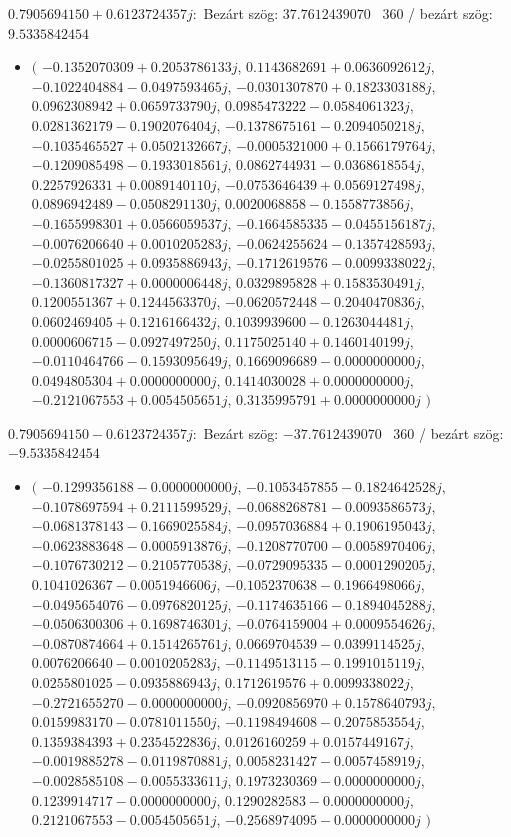 \documentclass[14pt,a4paper]{article}
\begin{document}
$0.7905694150+0.6123724357j$:\
Bezárt szög: $37.7612439070$ \
360 / bezárt szög: $9.5335842454$\
\begin{itemize}
\item
$\big($
$-0.1352070309+0.2053786133j$, $0.1143682691+0.0636092612j$, $-0.1022404884-0.0497593465j$, $-0.0301307870+0.1823303188j$, $0.0962308942+0.0659733790j$, $0.0985473222-0.0584061323j$, $0.0281362179-0.1902076404j$, $-0.1378675161-0.2094050218j$, $-0.1035465527+0.0502132667j$, $-0.0005321000+0.1566179764j$, $-0.1209085498-0.1933018561j$, $0.0862744931-0.0368618554j$, $0.2257926331+0.0089140110j$, $-0.0753646439+0.0569127498j$, $0.0896942489-0.0508291130j$, $0.0020068858-0.1558773856j$, $-0.1655998301+0.0566059537j$, $-0.1664585335-0.0455156187j$, $-0.0076206640+0.0010205283j$, $-0.0624255624-0.1357428593j$, $-0.0255801025+0.0935886943j$, $-0.1712619576-0.0099338022j$, $-0.1360817327+0.0000006448j$, $0.0329895828+0.1583530491j$, $0.1200551367+0.1244563370j$, $-0.0620572448-0.2040470836j$, $0.0602469405+0.1216166432j$, $0.1039939600-0.1263044481j$, $0.0000606715-0.0927497250j$, $0.1175025140+0.1460140199j$, $-0.0110464766-0.1593095649j$, $0.1669096689-0.0000000000j$, $0.0494805304+0.0000000000j$, $0.1414030028+0.0000000000j$, $-0.2121067553+0.0054505651j$, $0.3135995791+0.0000000000j$
$\big)$
\end{itemize}
$0.7905694150-0.6123724357j$:\
Bezárt szög: $-37.7612439070$ \
360 / bezárt szög: $-9.5335842454$\
\begin{itemize}
\item
$\big($
$-0.1299356188-0.0000000000j$, $-0.1053457855-0.1824642528j$, $-0.1078697594+0.2111599529j$, $-0.0688268781-0.0093586573j$, $-0.0681378143-0.1669025584j$, $-0.0957036884+0.1906195043j$, $-0.0623883648-0.0005913876j$, $-0.1208770700-0.0058970406j$, $-0.1076730212-0.2105770538j$, $-0.0729095335-0.0001290205j$, $0.1041026367-0.0051946606j$, $-0.1052370638-0.1966498066j$, $-0.0495654076-0.0976820125j$, $-0.1174635166-0.1894045288j$, $-0.0506300306+0.1698746301j$, $-0.0764159004+0.0009554626j$, $-0.0870874664+0.1514265761j$, $0.0669704539-0.0399114525j$, $0.0076206640-0.0010205283j$, $-0.1149513115-0.1991015119j$, $0.0255801025-0.0935886943j$, $0.1712619576+0.0099338022j$, $-0.2721655270-0.0000000000j$, $-0.0920856970+0.1578640793j$, $0.0159983170-0.0781011550j$, $-0.1198494608-0.2075853554j$, $0.1359384393+0.2354522836j$, $0.0126160259+0.0157449167j$, $-0.0019885278-0.0119870881j$, $0.0058231427-0.0057458919j$, $-0.0028585108-0.0055333611j$, $0.1973230369-0.0000000000j$, $0.1239914717-0.0000000000j$, $0.1290282583-0.0000000000j$, $0.2121067553-0.0054505651j$, $-0.2568974095-0.0000000000j$
$\big)$
\end{itemize}
\end{document}
